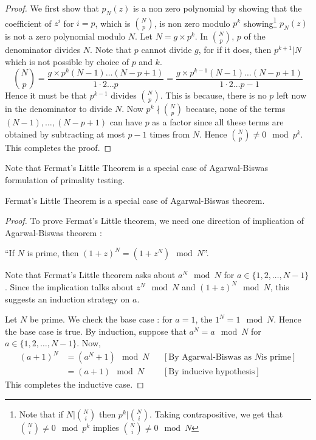 \begin{proof}
	We first show that $p_N(z)$ is a non zero polynomial by showing that
	the coefficient of $z^i$ for $i = p$, which is $\binom{N}{p}$, is non
	zero modulo $p^k$ showing\footnote{Note that if
		$N|\binom{N}{i}$ then $p^k | \binom{N}{i}$. Taking
		contrapositive, we get that $\binom{N}{i} \not = 0 \mod p^k$
		implies $\binom{N}{i} \not = 0 \mod N$} $p_N(z)$ is not a zero
		polynomial modulo $N$. 
	Let $N = g \times p^k$. In $\binom{N}{p}$, $p$ of the denominator 
	divides $N$. Note that $p$ cannot divide $g$, for if it does, then
	$p^{k+1} | N$ which is not possible by choice of $p$ and $k$.
		\begin{equation}
		\binom{N}{p} = \frac{g\times p^k(N-1)\ldots (N-p+1)}
		{1\cdot 2 \ldots p} = \frac{g\times p^{k-1}(N-1)\ldots 
			\label{eq:ag-bis-proof}
		(N-p+1)}{1\cdot 2 \ldots p-1} \end{equation}
	Hence it must be that $p^{k-1}$ divides $\binom{N}{p}$. This is
	because, there is no $p$ left now in the denominator to divide $N$.
	Now $p^k \nmid \binom{N}{p}$ because, none of the terms $(N-1),
	\ldots,
	(N-p+1)$ can have $p$ as a factor since all these terms are obtained by
	subtracting at most $p-1$ times from $N$. Hence $\binom{N}{p} \ne 0
	\mod p^k$. This completes the proof.
\end{proof}

Note that Fermat's Little Theorem is a special case of Agarwal-Biswas
formulation of primality testing.
\begin{claim}
Fermat's Little Theorem is a special case of Agarwal-Biswas theorem.
\end{claim}
\begin{proof}
	To prove Fermat's Little theorem, we need one direction of implication
	of Agarwal-Biswas theorem : 
	\begin{center}
	``If $N$ is prime, then $(1+z)^N = (1+z^N) \mod N$''.
	\end{center}

	Note that Fermat's Little theorem asks about $a^N \mod N$ for $a \in
	\{1,2,\ldots,N-1\}$. Since the implication talks about $z^N \mod N$
	and $(1+z)^N \mod N$, this suggests an induction strategy on $a$.

	Let $N$ be prime. We check the base case : for $a=1$, the
	$1^N =1 \mod N$. Hence the base case is true. By induction, suppose
	that $a^N = a \mod N$ for $a \in \{1,2,\ldots, N-1\}$. Now, 
	\begin{align*}
		(a+1)^N & = (a^N +1) \mod N && [\text{By Agarwal-Biswas as $N$
		is prime}]\\
		& = (a+1) \mod N && [\text{By inducive hypothesis}]
	\end{align*}
	This completes the inductive case. 
\end{proof}

